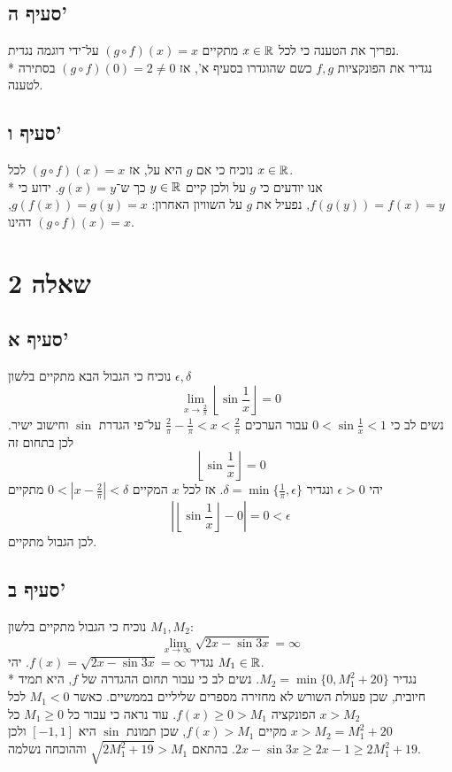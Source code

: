 \subsection{סעיף ה'}
נפריך את הטענה כי לכל $x \in \mathbb{R}$ מתקיים $(g \circ f)(x) = x$ על־ידי דוגמה נגדית. \\*
נגדיר את הפונקציות $f, g$ כשם שהוגדרו בסעיף א', אז $(g \circ f)(0) = 2 \ne 0$ בסתירה לטענה.

\subsection{סעיף ו'}
נוכיח כי אם $g$ היא על, אז $(g \circ f)(x) = x$ לכל $x \in \mathbb{R}$. \\*
אנו יודעים כי $g$ על ולכן קיים $y \in \mathbb{R}$ כך ש־$g(x) = y$.
ידוע כי $f(g(y)) = f(x) = y$, נפעיל את $g$ על השוויון האחרון: $g(f(x)) = g(y) = x$,
דהינו $(g \circ f)(x) = x$.

\section{שאלה 2}
\subsection{סעיף א'}
נוכיח כי הגבול הבא מתקיים בלשון $\epsilon, \delta$
\[
	\lim_{x \to \frac{2}{\pi}} \left\lfloor \sin \frac{1}{x} \right\rfloor = 0
\]
נשים לב כי $0 < \sin \frac{1}{x} < 1$ עבור הערכים $\frac{2}{\pi} - \frac{1}{\pi} < x < \frac{2}{\pi}$ על־פי הגדרת $\sin$ וחישוב ישיר.
לכן בתחום זה
\[
	\left\lfloor \sin \frac{1}{x} \right\rfloor = 0
\]
יהי $\epsilon > 0$ ונגדיר $\delta = \min\{ \frac{1}{\pi}, \epsilon \}$.
אז לכל $x$ המקיים $0 < | x - \frac{2}{\pi} | < \delta$ מתקיים
\[
	\left| \left\lfloor \sin \frac{1}{x} \right\rfloor - 0 \right| = 0 < \epsilon
\]
לכן הגבול מתקיים.

\subsection{סעיף ב'}
נוכיח כי הגבול מתקיים בלשון $M_1, M_2$:
\[
	\lim_{x \to \infty} \sqrt{2x - \sin 3x} = \infty
\]
נגדיר $f(x) = \sqrt{2x - \sin 3x} = \infty$. יהי $M_1 \in \mathbb{R}$. \\*
נגדיר $M_2 = \min\{ 0, M_1^2 + 20 \}$.
נשים לב כי עבור תחום ההגדרה של $f$, היא תמיד חיובית, שכן פעולת השורש לא מחזירה מספרים שליליים בממשיים.
כאשר $M_1 < 0$ לכל $x > M_2$ הפונקציה $f(x) \ge 0 > M_1$.
עוד נראה כי עבור כל $M_1 \ge 0$ כל $x > M_2 = M_1^2 + 20$ מקיים $f(x) > M_1$,
שכן תמונת $\sin$ היא $[-1, 1]$ ולכן $2x - \sin 3x \ge 2x - 1 \ge 2M_1^2 + 19$.
בהתאם $\sqrt{2M_1^2 + 19} > M_1$ וההוכחה נשלמה.

